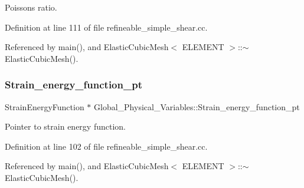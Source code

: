 Poisson\textquotesingle{}s ratio. 



Definition at line 111 of file refineable\+\_\+simple\+\_\+shear.\+cc.



Referenced by main(), and Elastic\+Cubic\+Mesh$<$ E\+L\+E\+M\+E\+N\+T $>$\+::$\sim$\+Elastic\+Cubic\+Mesh().

\mbox{\label{namespaceGlobal__Physical__Variables_af6838abf46c7850f1ee0b3452d6d2498}} 
\subsubsection{\texorpdfstring{Strain\+\_\+energy\+\_\+function\+\_\+pt}{Strain\_energy\_function\_pt}}
{\footnotesize\ttfamily Strain\+Energy\+Function $\ast$ Global\+\_\+\+Physical\+\_\+\+Variables\+::\+Strain\+\_\+energy\+\_\+function\+\_\+pt}



Pointer to strain energy function. 



Definition at line 102 of file refineable\+\_\+simple\+\_\+shear.\+cc.



Referenced by main(), and Elastic\+Cubic\+Mesh$<$ E\+L\+E\+M\+E\+N\+T $>$\+::$\sim$\+Elastic\+Cubic\+Mesh().

